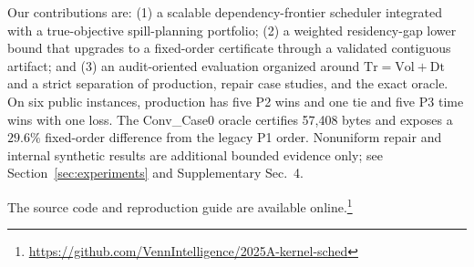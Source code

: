 Our contributions are: (1) a scalable dependency-frontier scheduler integrated
with a true-objective spill-planning portfolio; (2) a weighted residency-gap
lower bound that upgrades to a fixed-order certificate through a validated
contiguous artifact; and (3) an audit-oriented evaluation organized around
$\mathrm{Tr}=\mathrm{Vol}+\mathrm{Dt}$ and a strict separation of production,
repair case studies, and the exact oracle. On six public instances, production
has five P2 wins and one tie and five P3 time wins with one loss. The Conv\_Case0
oracle certifies 57,408 bytes and exposes a $29.6\%$ fixed-order difference from
the legacy P1 order. Nonuniform repair and internal synthetic results are
additional bounded evidence only; see Section~\ref{sec:experiments} and
Supplementary Sec.~4.

The source code and reproduction guide are available online.\footnote{\url{https://github.com/VennIntelligence/2025A-kernel-sched}}
